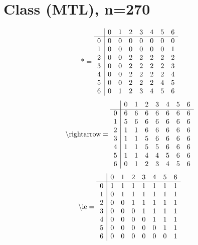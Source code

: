 \documentclass[11pt]{article}
\begin{document}
\section{Class (MTL), n=270}
\[\text{*} = 
\begin{array}{r | r r r r r r r}
 & 0 & 1 & 2 & 3 & 4 & 5 & 6 \\ \hline
0 & 0 & 0 & 0 & 0 & 0 & 0 & 0 \\
1 & 0 & 0 & 0 & 0 & 0 & 0 & 1 \\
2 & 0 & 0 & 2 & 2 & 2 & 2 & 2 \\
3 & 0 & 0 & 2 & 2 & 2 & 2 & 3 \\
4 & 0 & 0 & 2 & 2 & 2 & 2 & 4 \\
5 & 0 & 0 & 2 & 2 & 2 & 4 & 5 \\
6 & 0 & 1 & 2 & 3 & 4 & 5 & 6 \\
\end{array}
\]
\[\text{\textbackslash rightarrow} = 
\begin{array}{r | r r r r r r r}
 & 0 & 1 & 2 & 3 & 4 & 5 & 6 \\ \hline
0 & 6 & 6 & 6 & 6 & 6 & 6 & 6 \\
1 & 5 & 6 & 6 & 6 & 6 & 6 & 6 \\
2 & 1 & 1 & 6 & 6 & 6 & 6 & 6 \\
3 & 1 & 1 & 5 & 6 & 6 & 6 & 6 \\
4 & 1 & 1 & 5 & 5 & 6 & 6 & 6 \\
5 & 1 & 1 & 4 & 4 & 5 & 6 & 6 \\
6 & 0 & 1 & 2 & 3 & 4 & 5 & 6 \\
\end{array}
\]
\[\text{\textbackslash le} = 
\begin{array}{r | r r r r r r r}
 & 0 & 1 & 2 & 3 & 4 & 5 & 6 \\ \hline
0 & 1 & 1 & 1 & 1 & 1 & 1 & 1 \\
1 & 0 & 1 & 1 & 1 & 1 & 1 & 1 \\
2 & 0 & 0 & 1 & 1 & 1 & 1 & 1 \\
3 & 0 & 0 & 0 & 1 & 1 & 1 & 1 \\
4 & 0 & 0 & 0 & 0 & 1 & 1 & 1 \\
5 & 0 & 0 & 0 & 0 & 0 & 1 & 1 \\
6 & 0 & 0 & 0 & 0 & 0 & 0 & 1 \\
\end{array}
\]
\end{document}
